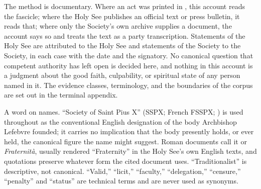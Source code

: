 The method is documentary. Where an act was printed in , this account reads the fascicle; where the Holy See
publishes an official text or press bulletin, it reads that; where only
the Society's own archive supplies a document, the account says so and
treats the text as a party transcription. Statements of the Holy See are
attributed to the Holy See and statements of the Society to the Society,
in each case with the date and the signatory. No canonical question that
competent authority has left open is decided here, and nothing in this
account is a judgment about the good faith, culpability, or spiritual
state of any person named in it. The evidence classes, terminology, and
the boundaries of the corpus are set out in the terminal appendix.

A word on names. ``Society of Saint Pius X'' (SSPX; French FSSPX;
) is used throughout as the
conventional English designation of the body Archbishop Lefebvre founded;
it carries no implication that the body presently holds, or ever held,
the canonical figure the name might suggest. Roman documents call it
 or \textit{Fraternità}, usually rendered ``Fraternity''
in the Holy See's own English texts, and quotations preserve whatever form
the cited document uses. ``Traditionalist'' is descriptive, not canonical.
``Valid,'' ``licit,'' ``faculty,'' ``delegation,'' ``censure,'' ``penalty''
and ``status'' are technical terms and are never used as synonyms.
